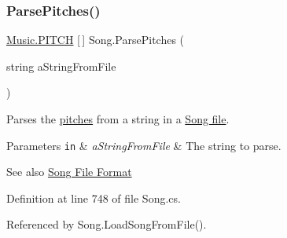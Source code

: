\subsubsection{\texorpdfstring{Parse\+Pitches()}{ParsePitches()}}
{\footnotesize\ttfamily \hyperlink{group___music_enums_ga508f69b199ea518f935486c990edac1d}{Music.\+P\+I\+T\+CH} \mbox{[}$\,$\mbox{]} Song.\+Parse\+Pitches (\begin{DoxyParamCaption}\item[{string}]{a\+String\+From\+File }\end{DoxyParamCaption})\hspace{0.3cm}{\ttfamily [private]}}



Parses the \hyperlink{group___music_enums_ga508f69b199ea518f935486c990edac1d}{pitches} from a string in a \hyperlink{group___song_group_DocSongFileFormat}{Song file}. 


\begin{DoxyParams}[1]{Parameters}
\mbox{\tt in}  & {\em a\+String\+From\+File} & The string to parse. \\
\hline
\end{DoxyParams}
\begin{DoxySeeAlso}{See also}
\hyperlink{group___song_group_DocSongFileFormat}{Song File Format} 
\end{DoxySeeAlso}


Definition at line 748 of file Song.\+cs.



Referenced by Song.\+Load\+Song\+From\+File().


